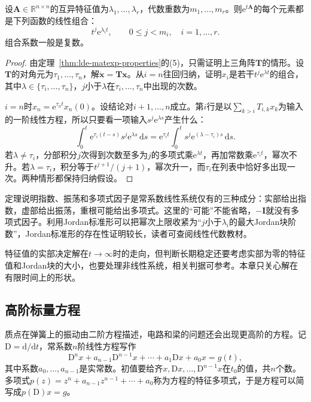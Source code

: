 \begin{theorem}[矩阵指数的元素]
\label{thm:lde-exponential-shape}
设$\bm{A}\in\mathbb{R}^{n\times n}$的互异特征值为$\lambda_1,\ldots,\lambda_r$，代数重数为$m_1,\ldots,m_r$。则$\mathrm{e}^{t\bm{A}}$的每个元素都是下列函数的线性组合：
\begin{equation}
 t^j\mathrm{e}^{\lambda_it},\qquad 0\leq j<m_i,\quad i=1,\ldots,r.
 \label{eq:lde-exponential-shape}
\end{equation}
组合系数一般是复数。
\end{theorem}

\begin{proof}
由定理~\ref{thm:lde-matexp-properties}的(5)，只需证明上三角阵$\bm{T}$的情形。设$\bm{T}$的对角元为$\tau_1,\ldots,\tau_n$，解$\dot{\bm{x}}=\bm{T}\bm{x}$。从$i=n$往回归纳，证明$x_i$是若干$t^j\mathrm{e}^{\lambda t}$的组合，其中$\lambda\in\{\tau_i,\ldots,\tau_n\}$，$j$小于$\lambda$在$\tau_i,\ldots,\tau_n$中出现的次数。

$i=n$时$x_n=\mathrm{e}^{\tau_nt}x_n(0)$。设结论对$i+1,\ldots,n$成立。第$i$行是以$\sum_{k>i}T_{i,k}x_k$为输入的一阶线性方程，所以只要看一项输入$s^j\mathrm{e}^{\lambda s}$产生什么：
\[
 \int_0^t\mathrm{e}^{\tau_i(t-s)}s^j\mathrm{e}^{\lambda s}\,\mathrm{d}s=\mathrm{e}^{\tau_it}\int_0^ts^j\mathrm{e}^{(\lambda-\tau_i)s}\,\mathrm{d}s.
\]
若$\lambda\neq\tau_i$，分部积分$j$次得到次数至多为$j$的多项式乘$\mathrm{e}^{\lambda t}$，再加常数乘$\mathrm{e}^{\tau_it}$，幂次不升。若$\lambda=\tau_i$，积分等于$t^{j+1}/(j+1)$，幂次升一，而$\tau_i$在列表中恰好多出现一次。两种情形都保持归纳假设。
\end{proof}

定理说明指数、振荡和多项式因子是常系数线性系统仅有的三种成分：实部给出指数，虚部给出振荡，重根可能给出多项式。这里的“可能”不能省略，$-\bm{I}$就没有多项式因子。利用Jordan标准形可以把幂次上限收紧为“$j$小于$\lambda_i$的最大Jordan块阶数”，Jordan标准形的存在性证明较长，读者可查阅线性代数教材。

特征值的实部决定解在$t\to\infty$时的走向，但判断长期稳定还要考虑实部为零的特征值和Jordan块的大小，也要处理非线性系统，相关判据可参考。本章只关心解在有限时间上的形状。

\subsection{高阶标量方程}
\label{sec:lde-high-order}

质点在弹簧上的振动由二阶方程描述，电路和梁的问题还会出现更高阶的方程。记$\mathrm{D}=\mathrm{d}/\mathrm{d}t$，常系数$n$阶线性方程写作
\begin{equation}
 \mathrm{D}^nx+a_{n-1}\mathrm{D}^{n-1}x+\cdots+a_1\mathrm{D}x+a_0x=g(t),
 \label{eq:lde-high-order}
\end{equation}
其中系数$a_0,\ldots,a_{n-1}$是实常数。初值要给齐$x,\mathrm{D}x,\ldots,\mathrm{D}^{n-1}x$在$t_0$的值，共$n$个数。多项式$p(z)=z^n+a_{n-1}z^{n-1}+\cdots+a_0$称为方程的特征多项式，于是方程可以简写成$p(\mathrm{D})x=g$。

